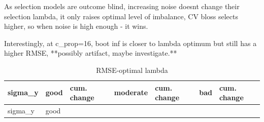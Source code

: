 \documentclass[
  letterpaper,
  DIV=11,
  numbers=noendperiod]{scrartcl}
\begin{document}
As selection models are outcome blind, increasing noise doesnt change
their selection lambda, it only raises optimal level of imbalance, CV
bloss selects higher, so when noise is high enough - it wins.

Interestingly, at c\_prop=16, boot inf is closer to lambda optimum but
still has a higher RMSE, **possibly artifact, maybe investigate.**

\begin{longtable}[]{@{}
  >{\raggedleft\arraybackslash}p{}
  >{\raggedleft\arraybackslash}p{}
  >{\raggedleft\arraybackslash}p{}
  >{\raggedleft\arraybackslash}p{}
  >{\raggedleft\arraybackslash}p{}
  >{\raggedleft\arraybackslash}p{}
  >{\raggedleft\arraybackslash}p{}@{}}
\caption{RMSE-optimal lambda}\tabularnewline
\toprule\noalign{}
\begin{minipage}[b]{\linewidth}\raggedleft
sigma\_y
\end{minipage} & \begin{minipage}[b]{\linewidth}\raggedleft
good
\end{minipage} & \begin{minipage}[b]{\linewidth}\raggedleft
cum. change
\end{minipage} & \begin{minipage}[b]{\linewidth}\raggedleft
moderate
\end{minipage} & \begin{minipage}[b]{\linewidth}\raggedleft
cum. change
\end{minipage} & \begin{minipage}[b]{\linewidth}\raggedleft
bad
\end{minipage} & \begin{minipage}[b]{\linewidth}\raggedleft
cum. change
\end{minipage} \\
\midrule\noalign{}
\endfirsthead
\toprule\noalign{}
\begin{minipage}[b]{\linewidth}\raggedleft
sigma\_y
\end{minipage} & \begin{minipage}[b]{\linewidth}\raggedleft
good
\end{minipage} & \begin{minipage}[b]{\linewidth}\raggedleft

\end{minipage}
\end{longtable}
\end{document}
